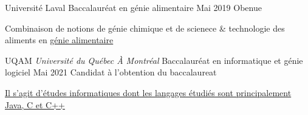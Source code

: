 

\begin{cventries}

  \cventry
    {Université Laval} %
    {Baccalauréat en génie alimentaire} %
    {Mai 2019} %
    {Obenue} %
    {
      \begin{cvitems} %
        \item{Combinaison de notions de génie chimique
            et de scienece \& technologie des aliments en
              \href{https://www.ulaval.ca/les-etudes/programmes/repertoire/details/baccalaureat-en-genie-alimentaire-b-ing.html}
                   {génie alimentaire}}
      \end{cvitems}
    }

  \cventry
    {UQAM \textit{Université du Québec À Montréal}} %
    {Baccalauréat en informatique et génie logiciel} %
    {Mai 2021} %
    {Candidat à l'obtention du baccalaureat} %
    {
      \begin{cvitems} %
        \item{\href{https://etudier.uqam.ca/programme?code=7416}
             {Il s'agit d'études informatiques dont les langages étudiés
              sont principalement Java, C et C++}}
      \end{cvitems}
    }

\end{cventries}
